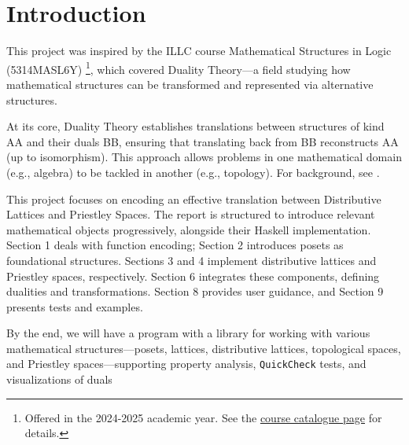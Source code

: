 \section{Introduction}
\label{sec:introduction}
This project was inspired by the ILLC course Mathematical Structures in Logic (5314MASL6Y) \footnote{Offered in the 2024-2025 academic year. See the \href{https://studiegids.uva.nl/xmlpages/page/2024-2025-en/search-course/course/118785}{course catalogue page} for details.}, which covered Duality Theory—a field studying how mathematical structures can be transformed and represented via alternative structures.

At its core, Duality Theory establishes translations between structures of kind AA and their duals BB, ensuring that translating back from BB reconstructs AA (up to isomorphism). This approach allows problems in one mathematical domain (e.g., algebra) to be tackled in another (e.g., topology). For background, see \cite{burrisCourseUniversalAlgebra2012, daveyIntroductionLatticesOrder2010, johnstoneStoneSpaces1992, kelleyGeneralTopology2007, munkresTopology2000}.

This project focuses on encoding an effective translation between Distributive Lattices and Priestley Spaces. The report is structured to introduce relevant mathematical objects progressively, alongside their Haskell implementation. Section 1 deals with function encoding; Section 2 introduces posets as foundational structures. Sections 3 and 4 implement distributive lattices and Priestley spaces, respectively. Section 6 integrates these components, defining dualities and transformations. Section 8 provides user guidance, and Section 9 presents tests and examples.

By the end, we will have a program with a library for working with various mathematical structures—posets, lattices, distributive lattices, topological spaces, and Priestley spaces—supporting property analysis, \texttt{QuickCheck} tests, and visualizations of duals










